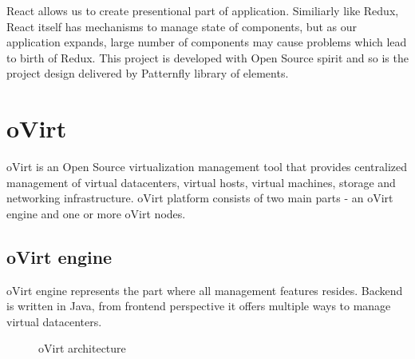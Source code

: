 React allows us to create presentional part of application. Similiarly like Redux, React itself has mechanisms to manage state of components, but as our application expands, large number of components may cause problems which lead to birth of Redux. This project is developed with Open Source spirit and so is the project design delivered by Patternfly\cite{Patternfly} library of elements.


\chapter{oVirt}
oVirt is an Open Source virtualization management tool that provides centralized management of virtual datacenters, virtual hosts, virtual machines, storage and networking infrastructure. oVirt platform consists of two main parts - an oVirt engine and one or more oVirt nodes.

\section{oVirt engine}
oVirt engine represents the part where all management features resides. Backend is written in Java, from frontend perspective it offers multiple ways to manage virtual datacenters.

\begin{figure}[h]
\caption{oVirt architecture}
\label{vector}
\end{figure}


